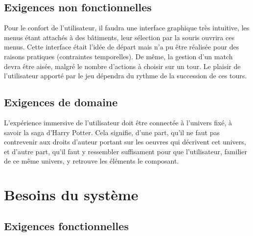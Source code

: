 \documentclass[a4paper,titlepage]{scrreprt}
\begin{document}
\section{Exigences non fonctionnelles}
  Pour le confort de l'utilisateur, il faudra  une interface graphique très intuitive, 
  les menus étant attachés à des  bâtiments, leur sélection par la souris ouvrira ces menus. Cette interface était l'idée de départ mais n'a pu être réalisée pour des raisons pratiques (contraintes temporelles).
  De même, la gestion d'un match devra être aisée, malgré le nombre d'actions à choisir 
  sur un tour. Le plaisir de l'utilisateur apporté par le jeu dépendra du rythme de la succession de ces tours.
\section{Exigences de domaine}
  L'expérience immersive de l'utilisateur doit être connectée à l'univers fixé, 
  à savoir la saga d'Harry Potter. Cela signifie, d'une part, 
  qu'il ne faut pas contrevenir aux droits d'auteur portant sur les oeuvres 
  qui décrivent cet univers, et d'autre part, qu'il faut y ressembler suffisament pour que 
  l'utilisateur, familier de ce même univers, y retrouve les éléments le composant.

\chapter{Besoins du système}
\section{Exigences fonctionnelles}
\end{document}
